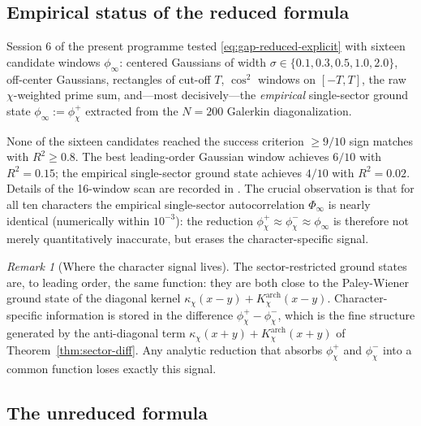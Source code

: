 \documentclass[10pt,twocolumn]{article}
\theoremstyle{definition}
\theoremstyle{remark}
\newtheorem{remark}[theorem]{Remark}
\newcommand{\chifn}{\chi}
\begin{document}
\subsection{Empirical status of the reduced formula}
\label{sec:formula-reduced-empirical}

Session 6 of the present programme tested \eqref{eq:gap-reduced-explicit}
with sixteen candidate windows $\phi_\infty$: centered Gaussians of
width $\sigma\in\{0.1,0.3,0.5,1.0,2.0\}$, off-center Gaussians, rectangles
of cut-off $T$, $\cos^2$ windows on $[-T,T]$, the raw
$\chifn$-weighted prime sum, and---most decisively---the \emph{empirical}
single-sector ground state
$\phi_\infty:=\phi_{\chifn}^+$ extracted from the $N=200$ Galerkin
diagonalization.

None of the sixteen candidates reached the success criterion
$\geq\!9/10$ sign matches with $R^2\geq 0.8$. The best
leading-order Gaussian window achieves $6/10$ with $R^2=0.15$; the
empirical single-sector ground state achieves $4/10$ with
$R^2=0.02$. Details of the 16-window scan are recorded in
\cite{Woche4Validation}. The crucial observation is that for all
ten characters the empirical single-sector autocorrelation
$\Phi_\infty$ is nearly identical (numerically within $10^{-3}$):
the reduction $\phi_{\chifn}^+\approx\phi_{\chifn}^-\approx
\phi_\infty$ is therefore not merely quantitatively inaccurate, but
erases the character-specific signal.

\begin{remark}[Where the character signal lives]
\label{rem:signal-locus}
The sector-restricted ground states are, to leading order, the same
function: they are both close to the Paley-Wiener ground state of
the diagonal kernel $\kappa_{\chifn}(x-y)+K^{\mathrm{arch}}_{\chifn}
(x-y)$. Character-specific information is stored in the difference
$\phi_{\chifn}^+-\phi_{\chifn}^-$, which is the fine structure
generated by the anti-diagonal term $\kappa_{\chifn}(x+y)+
K^{\mathrm{arch}}_{\chifn}(x+y)$ of Theorem~\ref{thm:sector-diff}.
Any analytic reduction that absorbs $\phi_{\chifn}^+$ and
$\phi_{\chifn}^-$ into a common function loses exactly this signal.
\end{remark}

\subsection{The unreduced formula}
\label{sec:formula-unreduced}
\end{document}
